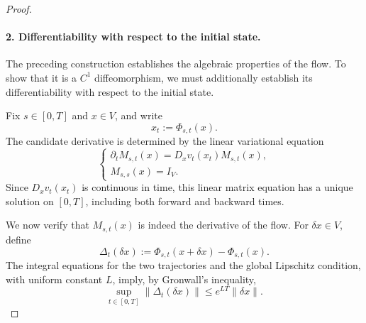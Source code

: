 \documentclass[12pt,a4paper,oneside]{book}
\begin{document}
\begin{proof}
\paragraph{2. Differentiability with respect to the initial state.}

The preceding construction establishes the algebraic properties of the flow. To show that it is a $C^1$ diffeomorphism,
we must additionally establish its differentiability with respect to the initial state.

Fix $s\in[0,T]$ and $x\in V$, and write
\begin{equation*}
    x_t:=\Phi_{s,t}(x).
\end{equation*}
The candidate derivative is determined by the linear variational equation
\begin{equation*}
    \begin{cases}
        \displaystyle \partial_t M_{s,t}(x) = D_xv_t(x_t)M_{s,t}(x),\\
        M_{s,s}(x)=I_V.
    \end{cases}
\end{equation*}
Since $D_xv_t(x_t)$ is continuous in time, this linear matrix equation has a unique solution on $[0,T]$, including both
forward and backward times.

We now verify that $M_{s,t}(x)$ is indeed the derivative of the flow. For $\delta x\in V$, define
\begin{equation*}
    \Delta_t(\delta x) := \Phi_{s,t}(x+\delta x)-\Phi_{s,t}(x).
\end{equation*}
The integral equations for the two trajectories and the global Lipschitz condition, with uniform constant $L$, imply, by
Gronwall's inequality,
\begin{equation*}
    \sup_{t\in[0,T]}\|\Delta_t(\delta x)\| \leq e^{LT}\|\delta x\|.
\end{equation*}


\end{proof}
\end{document}
